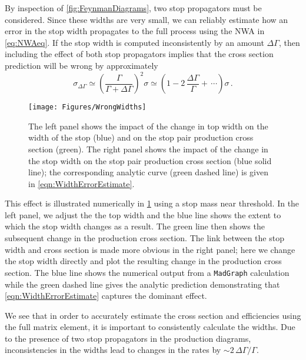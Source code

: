 \documentclass[a4paper,12pt]{article}
\begin{document}
By inspection of \cref{fig:FeynmanDiagrams}, two stop propagators must be considered.  Since these widths are very small, we can reliably estimate how an error in the stop width propagates to the full process using the NWA in \cref{eq:NWAeq}. If the stop width is computed inconsistently by an amount $\Delta\Gamma$, then including the effect of both stop propagators implies that the cross section prediction will be wrong by approximately
\begin{equation}
\sigma_{\Delta\Gamma} \simeq \left(\frac{\Gamma}{\Gamma+\Delta\Gamma}\right)^2 \sigma \simeq \left(1- 2\,\frac{\Delta\Gamma}{\Gamma} + \,\cdots \right) \sigma\,.
\label{eqn:WidthErrorEstimate}
\end{equation}

\begin{figure}[t]
\begin{center}
\texttt{[image: Figures/WrongWidths]}
\caption{The left panel shows the impact of the change in top width on the width of the stop (blue) and on the stop pair production cross section (green). The right panel shows  the impact of the change in the stop width on the stop pair production cross section (blue solid line); the corresponding analytic curve (green dashed line) is given in \cref{eqn:WidthErrorEstimate}.}
\label{fig:WrongWidths}
\end{center}
\end{figure}


This effect is illustrated numerically in \cref{fig:WrongWidths} using a stop mass near threshold. In the left panel, we adjust the the top width and the  blue line shows the extent to which the stop width changes as a result. The green line then shows the subsequent change in the production cross section.  The link between the stop width and cross section is made more obvious in the right panel; here we change the stop width directly and plot the resulting change in the production cross section. The blue line shows the numerical output from a \texttt{MadGraph} calculation while the green dashed line gives the analytic prediction demonstrating that \cref{eqn:WidthErrorEstimate} captures the dominant effect.

We see that in order to accurately estimate the cross section and efficiencies using the full matrix element, it is important to consistently calculate the widths. Due to the presence of two stop propagators in the production diagrams, inconsistencies in the widths lead to changes in the rates by $\sim2\, \Delta\Gamma / \Gamma$.
\end{document}
